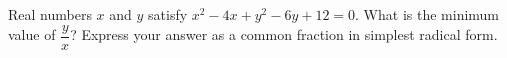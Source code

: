 Real numbers $x$ and $y$ satisfy $x^2-4x+y^2-6y+12=0$. What is the minimum value of $\dfrac {y}{x}$? Express your answer as a common fraction in simplest radical form.
